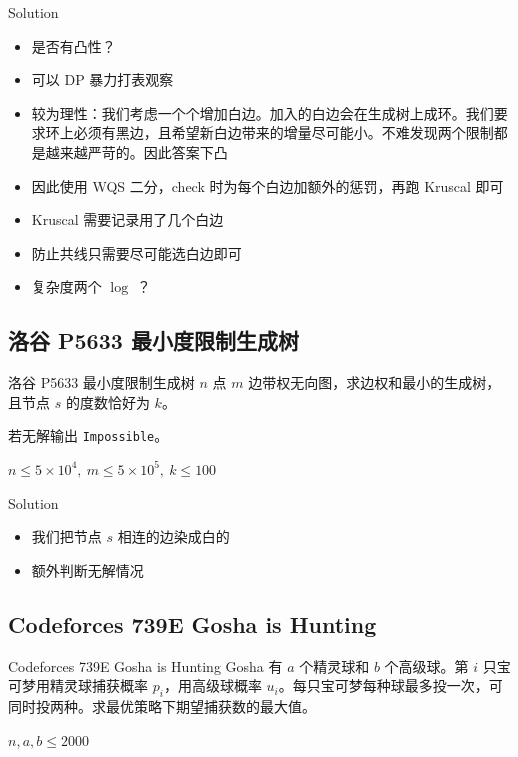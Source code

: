 ﻿\documentclass[aspectratio=169,handout]{ctexbeamer}
\begin{document}
\begin{frame}{Solution}
    \begin{itemize}
        \item 是否有凸性？
        \item 可以 DP 暴力打表观察
        \item 较为理性：我们考虑一个个增加白边。加入的白边会在生成树上成环。我们要求环上必须有黑边，且希望新白边带来的增量尽可能小。不难发现两个限制都是越来越严苛的。因此答案下凸
        \item 因此使用 WQS 二分，check 时为每个白边加额外的惩罚，再跑 Kruscal 即可
        \item Kruscal 需要记录用了几个白边
        \item 防止共线只需要尽可能选白边即可
        \item 复杂度两个 $\log$ ？
    \end{itemize}
\end{frame}









\subsection{洛谷 P5633 最小度限制生成树}
\begin{frame}{洛谷 P5633 最小度限制生成树}
    $n$ 点 $m$ 边带权无向图，求边权和最小的生成树，且节点 $s$ 的度数恰好为 $k$。

    
    若无解输出 \texttt{Impossible}。
    
    $n\le 5\times10^4,\ m\le 5\times10^5,\ k\le 100$
\end{frame}

\begin{frame}{Solution}
    \begin{itemize}
        \item 我们把节点 $s$ 相连的边染成白的
        \item 额外判断无解情况
    \end{itemize}
\end{frame}

\subsection{Codeforces 739E Gosha is Hunting}
\begin{frame}{Codeforces 739E Gosha is Hunting}
    Gosha 有 $a$ 个精灵球和 $b$ 个高级球。第 $i$ 只宝可梦用精灵球捕获概率 $p_i$，用高级球概率 $u_i$。每只宝可梦每种球最多投一次，可同时投两种。求最优策略下期望捕获数的最大值。
    
    $n,a,b\le 2000$
\end{frame}
\end{document}
